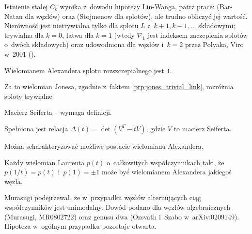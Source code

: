 Istnienie stałej $C_k$ wynika z~dowodu hipotezy Lin-Wanga, patrz prace: \cite{barnatan_95} (Bar-Natan dla węzłów) oraz \cite{stoimenow_01} (Stojmenow dla splotów), ale trudno obliczyć jej wartość.
Nierówność jest nietrywialna tylko dla splotu $L$ z~$k+1, k-1, \ldots$ składowymi; trywialna dla $k = 0$, łatwa dla $k=1$ (wtedy $\nabla_1$ jest indeksem zaczepienia splotów o~dwóch składowych) oraz udowodniona dla węzłów i~$k=2$ przez Polyaka, Viro w~2001 (\cite{polyak01}).

\begin{proposition}
	Wielomianem Alexandera splotu rozszczepialnego jest $1$.
\end{proposition}

Za to wielomian Jonesa, zgodnie z~faktem \ref{prp:jones_trivial_link}, rozróżnia sploty trywialne.

Macierz Seiferta -- wymaga definicji.
\begin{proposition}
	Spełniona jest relacja $\Delta(t)=\det(V^T-tV)$, gdzie $V$ to macierz Seiferta.
\end{proposition}

Można scharakteryzować możliwe postacie wielomianu Alexandera.

\begin{proposition}[Hosokowa, 1958]
	Każdy wielomian Laurenta $p(t)$ o~całkowitych współczynnikach taki, że $p(1/t) = p(t)$ i~$p(1) = \pm 1$ może być wielomianem Alexandera jakiegoś węzła.
\end{proposition}

Murasugi podejrzewał, że w~przypadku węzłów alternujących ciąg współczynników jest unimodalny.
Dowód podano dla węzłów algebraicznych (Murasugi, MR0802722) oraz genusu dwa (Ozsvath i~Szabo w~arXiv:0209149).
Hipoteza w~ogólnym przypadku pozostaje otwarta.


